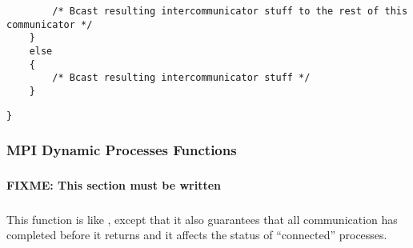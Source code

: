 \documentclass{article}
\def\fixme#1{\marginpar{FIXME:}\textbf{FIXME: #1}}
\begin{document}
\begin{small}
\begin{verbatim}
        /* Bcast resulting intercommunicator stuff to the rest of this communicator */
    }
    else
    {
        /* Bcast resulting intercommunicator stuff */
    }
\end{verbatim}
%        
%
%        
%        
%        
%        
%        
\begin{verbatim}
}
\end{verbatim}
\end{small}


\subsubsection{MPI Dynamic Processes Functions }
\label{sec:spawn-impl}

\subsubsection{}
\fixme{This section must be written}

\subsubsection{}
This function is like , except that it also guarantees
that all communication has completed before it returns and it affects the
status of ``connected'' processes.
\end{document}
